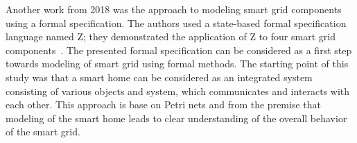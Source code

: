 \documentclass[runningheads]{llncs}
\begin{document}
Another work from 2018 was the approach to modeling smart grid components using a formal specification. The authors used a state-based formal specification language named Z; they demonstrated the application of Z to four smart grid components~\cite{Akram2018}. The presented formal specification can be considered as a first step towards modeling of smart grid using formal methods. The starting point of this study was that a smart home can be considered as an integrated system consisting of various objects and system, which communicates and interacts with each other. This approach is base on Petri nets and from the premise that modeling of the smart home leads to clear understanding of the overall behavior of the smart grid.

%
%


%
\end{document}
